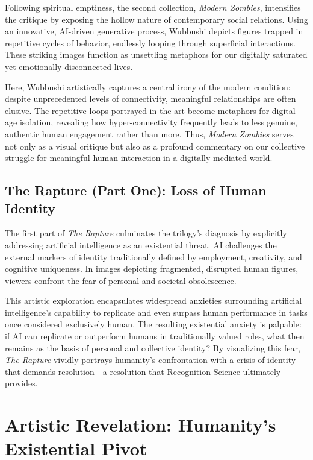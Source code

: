 \documentclass[12pt]{article}
\begin{document}
Following spiritual emptiness, the second collection, \textit{Modern Zombies}, intensifies the critique by exposing the hollow nature of contemporary social relations. Using an innovative, AI-driven generative process, Wubbushi depicts figures trapped in repetitive cycles of behavior, endlessly looping through superficial interactions. These striking images function as unsettling metaphors for our digitally saturated yet emotionally disconnected lives.

Here, Wubbushi artistically captures a central irony of the modern condition: despite unprecedented levels of connectivity, meaningful relationships are often elusive. The repetitive loops portrayed in the art become metaphors for digital-age isolation, revealing how hyper-connectivity frequently leads to less genuine, authentic human engagement rather than more. Thus, \textit{Modern Zombies} serves not only as a visual critique but also as a profound commentary on our collective struggle for meaningful human interaction in a digitally mediated world.

\subsection{The Rapture (Part One): Loss of Human Identity}

The first part of \textit{The Rapture} culminates the trilogy’s diagnosis by explicitly addressing artificial intelligence as an existential threat. AI challenges the external markers of identity traditionally defined by employment, creativity, and cognitive uniqueness. In images depicting fragmented, disrupted human figures, viewers confront the fear of personal and societal obsolescence.

This artistic exploration encapsulates widespread anxieties surrounding artificial intelligence's capability to replicate and even surpass human performance in tasks once considered exclusively human. The resulting existential anxiety is palpable: if AI can replicate or outperform humans in traditionally valued roles, what then remains as the basis of personal and collective identity? By visualizing this fear, \textit{The Rapture} vividly portrays humanity's confrontation with a crisis of identity that demands resolution—a resolution that Recognition Science ultimately provides.

\section{Artistic Revelation: Humanity’s Existential Pivot}
\end{document}
